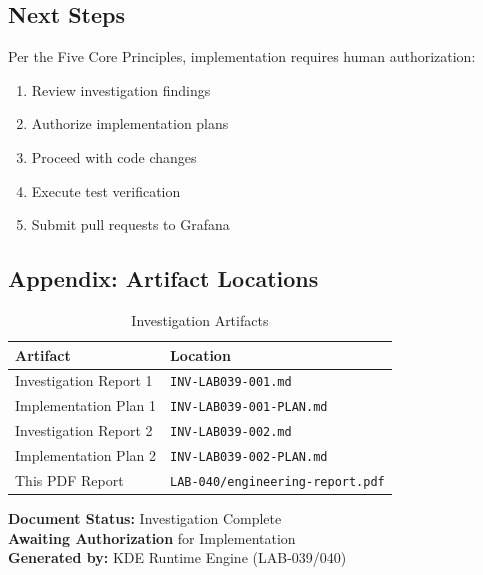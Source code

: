 \documentclass[12pt,a4paper,oneside]{article}
\begin{document}
\subsection{Next Steps}

Per the Five Core Principles, implementation requires human authorization:

\begin{enumerate}
    \item Review investigation findings
    \item Authorize implementation plans
    \item Proceed with code changes
    \item Execute test verification
    \item Submit pull requests to Grafana
\end{enumerate}

\subsection{Appendix: Artifact Locations}

\begin{table}[h]
\centering
\caption{Investigation Artifacts}
\begin{tabular}{ll}
\toprule
\textbf{Artifact} & \textbf{Location} \\
\midrule
Investigation Report 1 & \texttt{INV-LAB039-001.md} \\
Implementation Plan 1 & \texttt{INV-LAB039-001-PLAN.md} \\
Investigation Report 2 & \texttt{INV-LAB039-002.md} \\
Implementation Plan 2 & \texttt{INV-LAB039-002-PLAN.md} \\
This PDF Report & \texttt{LAB-040/engineering-report.pdf} \\
\bottomrule
\end{tabular}
\end{table}

\vfill

\begin{center}
\textbf{Document Status:} Investigation Complete\\
\textbf{Awaiting Authorization} for Implementation\\
\textbf{Generated by:} KDE Runtime Engine (LAB-039/040)
\end{center}
\end{document}
